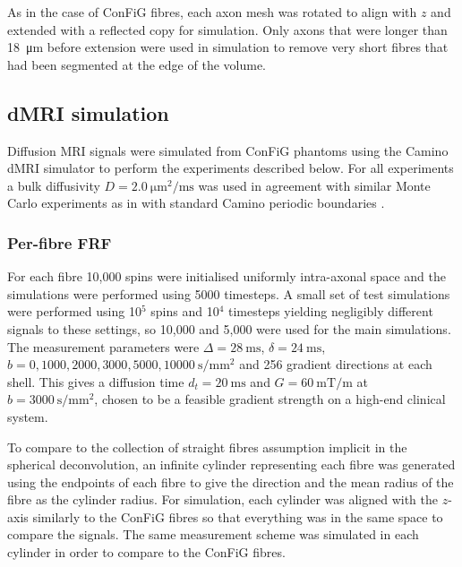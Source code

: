 As in the case of ConFiG fibres, each axon mesh was rotated to align with $z$ and extended with a reflected copy for simulation. Only axons that were longer than \SI{18}{\micro\metre} before extension were used in simulation to remove very short fibres that had been segmented at the edge of the volume. 



\subsection{dMRI simulation}
\label{sec:frf_dMRI_simulation}
Diffusion MRI signals were simulated from ConFiG phantoms using the Camino \ac{dMRI} simulator \cite{Cook2006,Hall2009} to perform the experiments described below. For all experiments a bulk diffusivity $D = \SI{2.0}{\micro\metre\squared\per\milli\second}$ was used in agreement with similar Monte Carlo experiments as in  with standard Camino periodic boundaries \cite{Panagiotaki2010}.


\subsubsection{Per-fibre \ac{FRF}}
For each fibre 10,000 spins were initialised uniformly intra-axonal space and the simulations were performed using 5000 timesteps. A small set of test simulations were performed using 10$^5$ spins and 10$^4$ timesteps yielding negligibly different signals to these settings, so 10,000 and 5,000 were used for the main simulations. The measurement parameters were $\Delta = \SI{28}{\milli\second}$, $\delta = \SI{24}{\milli\second}$, $b = 0,1000,2000,3000,5000,\SI{10000}{\second\per\milli\metre\squared}$ and 256 gradient directions at each shell. This gives a diffusion time $d_t = \SI{20}{\milli\second}$ and $G = \SI{60}{\milli\tesla\per\metre}$ at $b = \SI{3000}{\second\per\milli\metre\squared}$, chosen to be a feasible gradient strength on a high-end clinical system.

To compare to the collection of straight fibres assumption implicit in the spherical deconvolution, an infinite cylinder representing each fibre was generated using the endpoints of each fibre to give the direction and the mean radius of the fibre as the cylinder radius. For simulation, each cylinder was aligned with the $z$-axis similarly to the ConFiG fibres so that everything was in the same space to compare the signals. The same measurement scheme was simulated in each cylinder in order to compare to the \ac{ConFiG} fibres.


